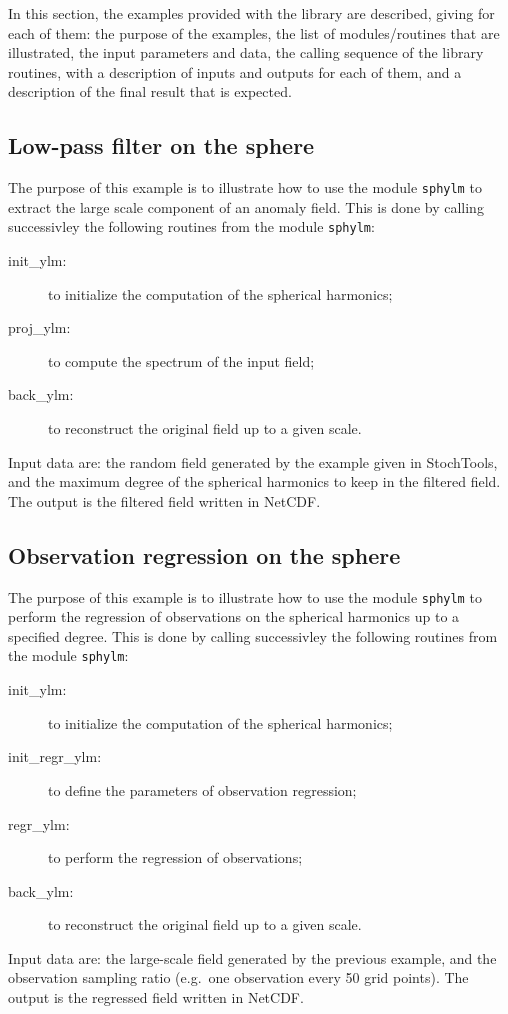 \documentclass[11pt]{article}
\begin{document}
In this section,
the examples provided with the library are described,
giving for each of them:
the purpose of the examples,
the list of modules/routines that are illustrated,
the input parameters and data,
the calling sequence of the library routines,
with a description of inputs and outputs for each of them, and
a description of the final result that is expected.

\subsection{Low-pass filter on the sphere}

The purpose of this example is to illustrate
how to use the module {\tt sphylm} to extract
the large scale component of an anomaly field.
This is done by calling successivley the following routines
from the module {\tt sphylm}:

\begin{description}
\item[init\_ylm:] to initialize the computation of the spherical harmonics;
\item[proj\_ylm:] to compute the spectrum of the input field;
\item[back\_ylm:] to reconstruct the original field up to a given scale.
\end{description}

\noindent
Input data are: the random field generated by the example given in StochTools,
and the maximum degree of the spherical harmonics to keep in the filtered field.
The output is the filtered field written in NetCDF.

\subsection{Observation regression on the sphere}

The purpose of this example is to illustrate
how to use the module {\tt sphylm} to perform
the regression of observations on the spherical harmonics
up to a specified degree.
This is done by calling successivley the following routines
from the module {\tt sphylm}:

\begin{description}
\item[init\_ylm:] to initialize the computation of the spherical harmonics;
\item[init\_regr\_ylm:] to define the parameters of observation regression;
\item[regr\_ylm:] to perform the regression of observations;
\item[back\_ylm:] to reconstruct the original field up to a given scale.
\end{description}

\noindent
Input data are: the large-scale field generated by the previous example,
and the observation sampling ratio (e.g.\ one observation every 50 grid points).
The output is the regressed field written in NetCDF.
\end{document}
